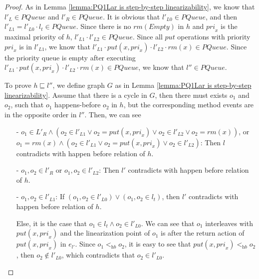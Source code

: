 \begin {proof}
As in Lemma \ref{lemma:PQ1Lar is step-by-step linearizability}, we know that $l'_L \in \textit{PQueue}$ and $l'_R \in \textit{PQueue}$. It is obvious that $l'_{\textit{L0}} \in \textit{PQueue}$, and then $l'_{\textit{L1}} = l'_{\textit{L0}} \cdot l_t \in \textit{PQueue}$. Since there is no $\textit{rm}(\textit{Empty})$ in $h$ and $\textit{pri}_x$ is the maximal priority of $h$, $l'_{L1} \cdot l'_{L2} \in \textit{PQueue}$. Since all $\textit{put}$ operations with priority $\textit{pri}_x$ is in $l'_{L1}$, we know that $l'_{L1} \cdot \textit{put}(x,\textit{pri}_x) \cdot l'_{L2} \cdot \textit{rm}(x) \in \textit{PQueue}$. Since the priority queue is empty after executing $l'_{L1} \cdot \textit{put}(x,\textit{pri}_x) \cdot l'_{L2} \cdot \textit{rm}(x) \in \textit{PQueue}$, we know that $l'' \in \textit{PQueue}$.

To prove $h \sqsubseteq l''$, we define graph $G$ as in Lemma \ref{lemma:PQ1Lar is step-by-step linearizability}. Assume that there is a cycle in $G$, then there must exists $o_1$ and $o_2$, such that $o_1$ happens-before $o_2$ in $h$, but the corresponding method events are in the opposite order in $l''$. Then, we can see

\begin{itemize}
\setlength{\itemsep}{0.5pt}

\item[-] $o_1 \in L'_R \wedge (o_2 \in l'_{L1} \vee o_2 = \textit{put}(x,\textit{pri}_x) \vee o_2 \in l'_{L2} \vee o_2 = \textit{rm}(x))$, or $o_1 = \textit{rm}(x) \wedge (o_2 \in l'_{L1} \vee o_2 = \textit{put}(x,\textit{pri}_x) \vee o_2 \in l'_{L2})$: Then $l$ contradicts with happen before relation of $h$.

\item[-] $o_1, o_2 \in l'_R$ or $o_1, o_2 \in l'_{L2}$: Then $l'$ contradicts with happen before relation of $h$.

\item[-] $o_1, o_2 \in l'_{L1}$: If $(o_1, o_2 \in l'_{L0}) \vee (o_1,o_2 \in l_t)$, then $l'$ contradicts with happen before relation of $h$.

    Else, it is the case that $o_1 \in l_t \wedge o_2 \in l'_{L0}$. We can see that $o_1$ interleaves with $\textit{put}(x,\textit{pri}_x)$ and the linearization point of $o_1$ is after the return action of $\textit{put}(x,\textit{pri}_x)$ in $e_{l'}$. Since $o_1 <_{\textit{hb}} o_2$, it is easy to see that $\textit{put}(x,\textit{pri}_x) <_{\textit{hb}} o_2$, then $o_2 \notin l'_{L0}$, which contradicts that $o_2 \in l'_{L0}$.


\end{itemize}
\end{proof}
